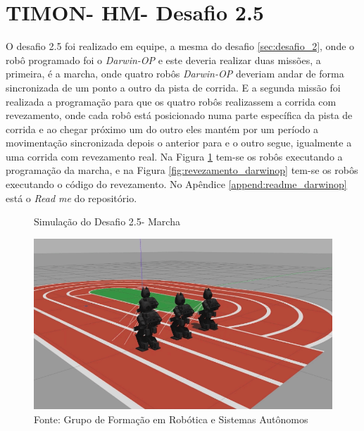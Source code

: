 \section{TIMON- HM- Desafio 2.5}
\label{sec:desafio_2_5}
O desafio 2.5 foi realizado em equipe, a mesma do desafio \ref{sec:desafio_2}, onde o robô programado foi o \textit{Darwin-OP} e este deveria realizar duas missões, a primeira, é a marcha, onde quatro robôs \textit{Darwin-OP} deveriam andar de forma sincronizada de um ponto a outro da pista de corrida. E a segunda missão foi realizada a programação para que os quatro robôs realizassem a corrida com revezamento, onde cada robô está posicionado numa parte específica da pista de corrida e ao chegar próximo um do outro eles mantém por um período a movimentação sincronizada depois o anterior para e o outro segue, igualmente a uma corrida com revezamento real.
Na Figura \ref{fig:marcha_darwinop} tem-se os robôs executando a programação da marcha, e na Figura \ref{fig:revezamento_darwinop} tem-se os robôs executando o código do revezamento. No Apêndice \ref{append:readme_darwinop} está o \textit{Read me} do repositório.



\begin{figure}[H]
    \caption{Simulação do Desafio 2.5- Marcha}
    \centering
    \includegraphics[width= \textwidth]{Figures/marcha.png}
    \caption*{Fonte: Grupo de Formação em Robótica e Sistemas Autônomos}
    \label{fig:marcha_darwinop}
\end{figure}



